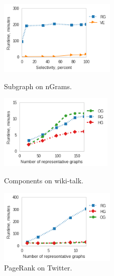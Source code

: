 \begin{figure}[t]
\centering
\begin{minipage}{2.2in}
\centering
\includegraphics[width=2.2in]{figs/subgraph_ngrams_build13.png}
\vspace{-0.2in}
\caption{Subgraph on nGrams.}
\label{fig:subgraphngrams}
\vspace{-0.1in}
\end{minipage}
\begin{minipage}{2.15in}
\centering
\includegraphics[width=2.15in]{figs/cc_wikitalk_build13.png}
\vspace{-0.2in}
\caption{Components on wiki-talk.}
\label{fig:ccwiki}
\vspace{-0.1in}
\end{minipage}
\begin{minipage}{2.2in}
\centering
\includegraphics[width=2.2in]{figs/prank_twitter_build13.png}
\vspace{-0.2in}
\caption{PageRank on Twitter.}
\label{fig:pranktwitter}
\vspace{-0.1in}
\end{minipage}
\end{figure}

